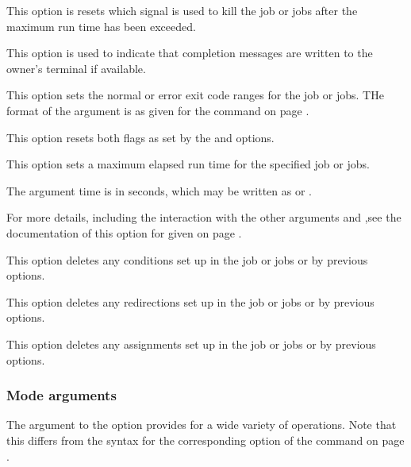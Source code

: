 
This option is resets which signal is used to kill the job or jobs after the maximum run time has been exceeded.


This option is used to indicate that completion messages are written to the owner's terminal if available.


This option sets the normal or error exit code ranges for the job or jobs. THe format of the  argument is as given for the
\PrBtr{} command on page \pageref{btr:exits}.


This option resets both flags as set by the  and  options.


This option sets a maximum elapsed run time for the specified job or jobs.

The argument time is in seconds, which may be written as  or .

For more details, including the interaction with the other arguments  and ,see the documentation of this option for
\PrBtr{} given on page \pageref{btr:runtime}.


This option deletes any conditions set up in the job or jobs or by previous  options.


This option deletes any redirections set up in the job or jobs or by previous  options.


This option deletes any assignments set up in the job or jobs or by previous  options.


\subsubsection{Mode arguments}

The argument to the  option provides for a wide variety of operations. Note that this differs from the syntax for the corresponding
option of the \PrBtr{} command on page \pageref{btr:modefmt}.

